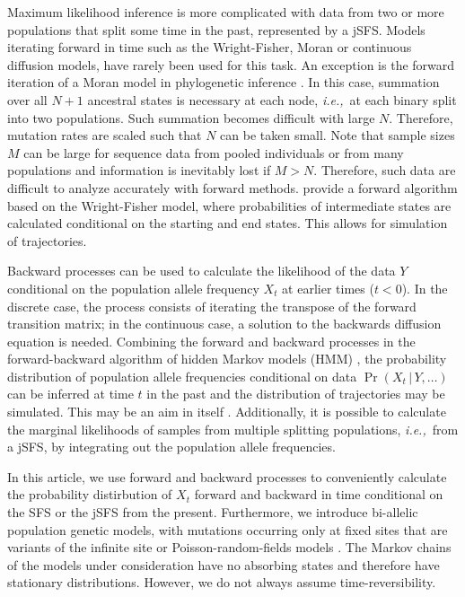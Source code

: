 \documentclass[preprint]{elsarticle}
\newcommand\given{{\,|\,}}
\newcommand\ie{{\it i.e.,}}
\begin{document}
Maximum likelihood inference is more complicated with data from two or more populations that split some time in the past, represented by a jSFS. Models iterating forward in time such as the Wright-Fisher, Moran or continuous diffusion models, have rarely been used for this task. An exception is the forward iteration of a Moran model in phylogenetic inference \citep{Schrempf2016}. In this case, summation over all $N+1$ ancestral states is necessary at each node, \ie\ at each binary split into two populations. Such summation becomes difficult with large $N$. Therefore, mutation rates are scaled such that $N$ can be taken small. Note that sample sizes $M$ can be large for sequence data from pooled individuals or from many populations and information is inevitably lost if $M>N$. Therefore, such data are  difficult to analyze accurately with forward methods. %
\citet{Zhao14} provide a forward algorithm based on the Wright-Fisher model, where probabilities of intermediate states are calculated conditional on the starting and end states. This allows for simulation of trajectories. 

Backward processes can be used to calculate the likelihood of the data $Y$ conditional on the population allele frequency $X_t$  at earlier times ($t<0$). %
In the discrete case, the process consists of iterating the transpose of the forward transition matrix; in the continuous case, a solution to the backwards diffusion equation is needed.
Combining the forward and backward processes in the forward-backward algorithm of hidden Markov models (HMM) \citep{Rabi86}, the probability distribution of population allele frequencies conditional on data $\Pr(X_t\given Y,\dots)$ can be inferred at time $t$ in the past and the distribution of trajectories may be simulated. This may be an aim in itself \citep{Zhao14}. Additionally, it is  possible to calculate the marginal likelihoods of samples from multiple splitting populations, \ie\ from a jSFS, by integrating out the population allele frequencies.

In this article, we use forward and backward processes to conveniently calculate the probability distirbution of $X_t$ forward and backward in time conditional on the SFS or the jSFS from the present. %
Furthermore, we introduce bi-allelic population genetic models, with mutations occurring only at fixed sites that are variants of the infinite site or Poisson-random-fields models \citep{Kimu69,Sawy92}. The Markov chains of the models under consideration have no absorbing states and therefore have stationary distributions. However, we do not always assume time-reversibility.
\end{document}
